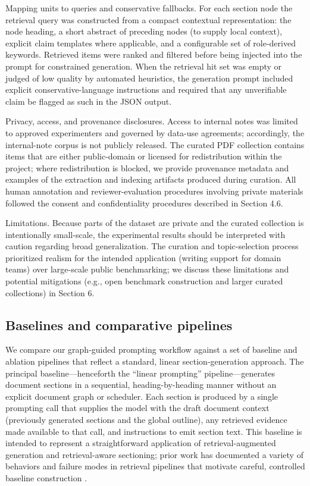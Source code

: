 \documentclass{article}%
\begin{document}
Mapping units to queries and conservative fallbacks. For each section node the retrieval query was constructed from a compact contextual representation: the node heading, a short abstract of preceding nodes (to supply local context), explicit claim templates where applicable, and a configurable set of role-derived keywords. Retrieved items were ranked and filtered before being injected into the prompt for constrained generation. When the retrieval hit set was empty or judged of low quality by automated heuristics, the generation prompt included explicit conservative-language instructions and required that any unverifiable claim be flagged as such in the JSON output.

Privacy, access, and provenance disclosures. Access to internal notes was limited to approved experimenters and governed by data-use agreements; accordingly, the internal-note corpus is not publicly released. The curated PDF collection contains items that are either public-domain or licensed for redistribution within the project; where redistribution is blocked, we provide provenance metadata and examples of the extraction and indexing artifacts produced during curation. All human annotation and reviewer-evaluation procedures involving private materials followed the consent and confidentiality procedures described in Section 4.6.

Limitations. Because parts of the dataset are private and the curated collection is intentionally small-scale, the experimental results should be interpreted with caution regarding broad generalization. The curation and topic-selection process prioritized realism for the intended application (writing support for domain teams) over large-scale public benchmarking; we discuss these limitations and potential mitigations (e.g., open benchmark construction and larger curated collections) in Section 6.%

%
\subsection{Baselines and comparative pipelines}%


%
We compare our graph-guided prompting workflow against a set of baseline and ablation pipelines that reflect a standard, linear section-generation approach. The principal baseline—henceforth the ``linear prompting'' pipeline—generates document sections in a sequential, heading-by-heading manner without an explicit document graph or scheduler. Each section is produced by a single prompting call that supplies the model with the draft document context (previously generated sections and the global outline), any retrieved evidence made available to that call, and instructions to emit section text. This baseline is intended to represent a straightforward application of retrieval-augmented generation and retrieval-aware sectioning; prior work has documented a variety of behaviors and failure modes in retrieval pipelines that motivate careful, controlled baseline construction \cite{web_penha_2021_evaluating_the_robustness_of_retrieval_pipelines,web_penha_2023_do_the_findings_of_document_and_passage_retrieva}. 
\end{document}
